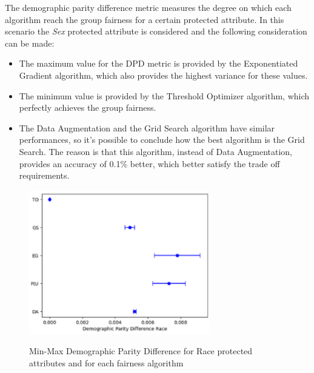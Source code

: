 The demographic parity difference metric measures the degree on which each algorithm reach the group fairness for a certain protected attribute. In this scenario the \emph{Sex} protected attribute is considered and the following consideration can be made:

\begin{itemize}

    \item The maximum value for the DPD metric is provided by the Exponentiated Gradient algorithm, which also provides the highest variance for these values.

    \item The minimum value is provided by the Threshold Optimizer algorithm, which perfectly achieves the group fairness.

    \item The Data Augmentation and the Grid Search algorithm have similar performances, so it's possible to conclude how the best algorithm is the Grid Search. The reason is that this algorithm, instead of Data Augmentation, provides an accuracy of 0.1\% better, which better satisfy the trade off requirements.

\end{itemize}


\begin{figure}[H]
    \centering
    \includegraphics[width=0.7\textwidth, height=0.7\textwidth]{dpdr.png}
    \label{fig:dpdr}
    \caption{Min-Max Demographic Parity Difference for Race protected attributes and for each fairness algorithm}
\end{figure}

